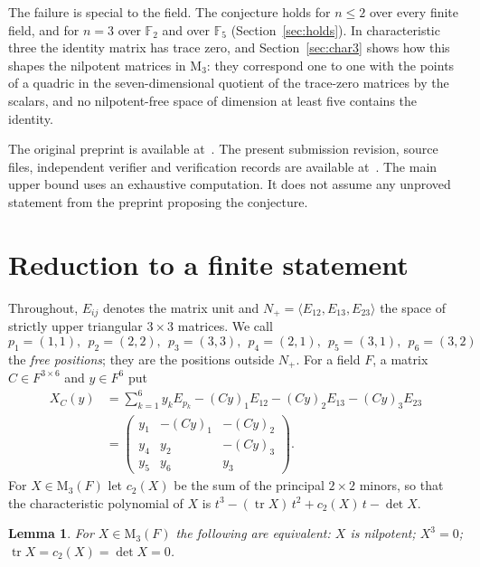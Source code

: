 \documentclass[screen]{aomart}
\newtheorem{lemma}[theorem]{Lemma}
\theoremstyle{definition}
\theoremstyle{remark}
\numberwithin{equation}{section}
\newcommand{\F}{\mathbb{F}}
\newcommand{\M}{\mathrm{M}}
\newcommand{\tr}{\operatorname{tr}}
\begin{document}
The failure is special to the field. The conjecture holds for $n\le2$ over every finite field, and for $n=3$ over $\F_2$ and over $\F_5$ (Section~\ref{sec:holds}). In characteristic three the identity matrix has trace zero, and Section~\ref{sec:char3} shows how this shapes the nilpotent matrices in $\M_3$: they correspond one to one with the points of a quadric in the seven-dimensional quotient of the trace-zero matrices by the scalars, and no nilpotent-free space of dimension at least five contains the identity.

The original preprint is available at~\cite{Preprint}. The present submission revision, source files, independent verifier and verification records are available at~\cite{Revision}. The main upper bound uses an exhaustive computation. It does not assume any unproved statement from the preprint proposing the conjecture.

\section{Reduction to a finite statement}\label{sec:reduction}

Throughout, $E_{ij}$ denotes the matrix unit and $N_+=\langle E_{12},E_{13},E_{23}\rangle$ the space of strictly upper triangular $3\times 3$ matrices. We call
\[
p_1=(1,1),\ \ p_2=(2,2),\ \ p_3=(3,3),\ \ p_4=(2,1),\ \ p_5=(3,1),\ \ p_6=(3,2)
\]
the \emph{free positions}; they are the positions outside $N_+$. For a field $F$, a matrix $C\in F^{3\times6}$ and $y\in F^6$ put
\begin{equation}\label{eq:XC}
\begin{split}
X_C(y)&=\sum_{k=1}^{6}y_k E_{p_k}-(Cy)_1E_{12}-(Cy)_2E_{13}-(Cy)_3E_{23}\\
&=\begin{pmatrix} y_1&-(Cy)_1&-(Cy)_2\\ y_4&y_2&-(Cy)_3\\ y_5&y_6&y_3\end{pmatrix}.
\end{split}
\end{equation}
For $X\in\M_3(F)$ let $c_2(X)$ be the sum of the principal $2\times2$ minors, so that the characteristic polynomial of $X$ is $t^3-(\tr X)\,t^2+c_2(X)\,t-\det X$.

\begin{lemma}\label{lem:nil}
For $X\in\M_3(F)$ the following are equivalent: $X$ is nilpotent; $X^3=0$; $\tr X=c_2(X)=\det X=0$.
\end{lemma}
\end{document}
